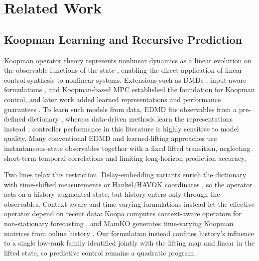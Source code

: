 \section{Related Work}
\label{sec:related_work}

\subsection{Koopman Learning and Recursive Prediction}

Koopman operator theory represents nonlinear dynamics as a linear evolution on the observable functions of the state \cite{koopman1931hamiltonian, koopman1932spectra, mezic2005spectral}, enabling the direct application of linear control synthesis to nonlinear systems. Extensions such as DMDc \cite{proctor2016dmdc}, input-aware formulations \cite{proctor2018generalizing, brunton2016invariant}, and Koopman-based MPC \cite{korda2018linear} established the foundation for Koopman control, and later work added learned representations and performance guarantees \cite{han2020deep, shi2022deep, strasser2026overview, duran2025control}. To learn such models from data, EDMD fits observables from a pre-defined dictionary \cite{williams2015data, williams2015kernel, klus2018data}, whereas data-driven methods learn the representations instead \cite{takeishi2017koopman, lusch2018deep, yeung2019learning, morton2019deep, yuan2022variational}; controller performance in this literature is highly sensitive to model quality. Many conventional EDMD and learned-lifting approaches use instantaneous-state observables together with a fixed lifted transition, neglecting short-term temporal correlations and limiting long-horizon prediction accuracy.

Two lines relax this restriction. Delay-embedding variants enrich the dictionary with time-shifted measurements or Hankel/HAVOK coordinates \cite{kamb2020timedelay, brunton2017chaos, arbabi2017ergodic, das2019delay}, so the operator acts on a history-augmented state, but history enters only through the observables. Context-aware and time-varying formulations instead let the effective operator depend on recent data: Koopa computes context-aware operators for non-stationary forecasting \cite{liu2023koopa}, and MamKO generates time-varying Koopman matrices from online history \cite{li2025mamko}. Our formulation instead confines history's influence to a single low-rank family identified jointly with the lifting map and linear in the lifted state, so predictive control remains a quadratic program.

